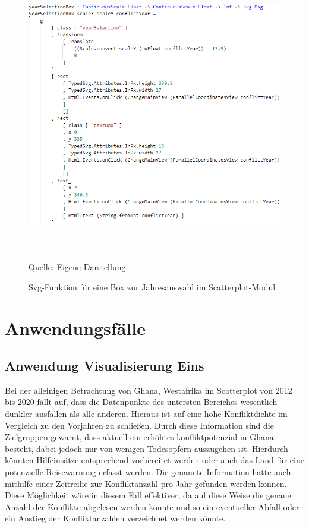 \documentclass[usegeometry=true]{scrartcl}
\begin{document}
\begin{figure}[]
\begin{center}
\includegraphics[width=12cm,height=12cm,keepaspectratio]{yearSelectionBox.PNG}%
\caption{Svg-Funktion für eine Box zur Jahresauswahl im Scatterplot-Modul}
Quelle: Eigene Darstellung
\label{yearSelectionBox}
\end{center}
\end{figure}

\section{Anwendungsfälle}

\subsection{Anwendung Visualisierung Eins}
Bei der alleinigen Betrachtung von Ghana, Westafrika im Scatterplot von 2012 bis 2020 fällt auf, dass die Datenpunkte des untersten Bereiches wesentlich dunkler ausfallen als alle anderen. Hieraus ist auf eine hohe Konfliktdichte im Vergleich zu den Vorjahren zu schließen. Durch diese Information sind die Zielgruppen gewarnt, dass aktuell ein erhöhtes konfliktpotenzial in Ghana besteht, dabei jedoch nur von wenigen Todesopfern auszugehen ist. Hierdurch könnten Hilfeinsätze entsprechend vorbereitet werden oder auch das Land für eine potenzielle Reisewarnung erfasst werden. Die genannte Information hätte auch mithilfe einer Zeitreihe zur Konfliktanzahl pro Jahr gefunden werden können. Diese Möglichkeit wäre in diesem Fall effektiver, da auf diese Weise die genaue Anzahl der Konflikte abgelesen werden könnte und so ein eventueller Abfall oder ein Anstieg der Konfliktanzahlen verzeichnet werden könnte.\\
\end{document}
